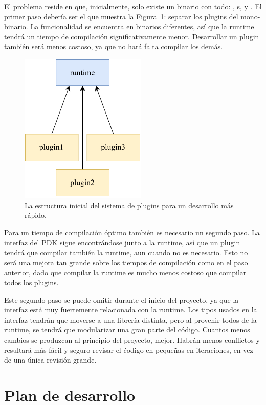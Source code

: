 El problema reside en que, inicialmente, solo existe un binario con todo:
, s, y . El primer paso debería ser el
que muestra la Figura~\ref{fig:separation_temporary}: separar los plugins del
mono-binario. La funcionalidad se encuentra en binarios diferentes, así que la
runtime tendrá un tiempo de compilación significativamente menor. Desarrollar un
plugin también será menos costoso, ya que no hará falta compilar los demás.

\begin{figure}
    \centering
    \includegraphics[width=6cm]{./Imagenes/separation-temporary.pdf}
    \caption{La estructura inicial del sistema de plugins para un desarrollo más
    rápido.}%
    \label{fig:separation_temporary}
\end{figure}

Para un tiempo de compilación óptimo también es necesario un segundo paso. La
interfaz del PDK sigue encontrándose junto a la runtime, así que un plugin
tendrá que compilar también la runtime, aun cuando no es necesario. Esto no será
una mejora tan grande sobre los tiempos de compilación como en el paso anterior,
dado que compilar la runtime es mucho menos costoso que compilar todos los
plugins.

Este segundo paso se puede omitir durante el inicio del proyecto, ya que la
interfaz está muy fuertemente relacionada con la runtime. Los tipos usados en la
interfaz tendrán que moverse a una librería distinta, pero al provenir todos de
la runtime, se tendrá que modularizar una gran parte del código. Cuantos menos
cambios se produzcan al principio del proyecto, mejor. Habrán menos conflictos y
resultará más fácil y seguro revisar el ćodigo en pequeñas en iteraciones, en
vez de una única revisión grande.

\section{Plan de desarrollo}


